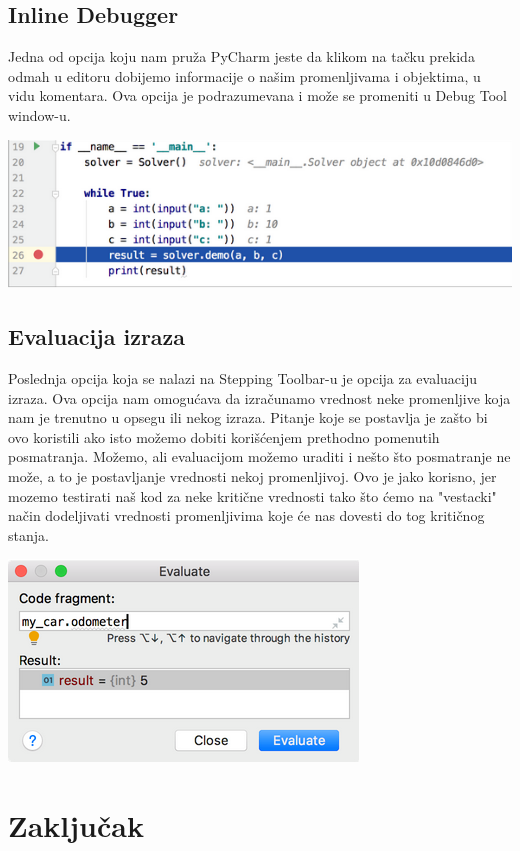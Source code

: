 \documentclass[a4paper]{article}
\begin{document}
\subsection{Inline Debugger}
Jedna od opcija koju nam pruža PyCharm jeste da klikom na tačku prekida odmah u editoru dobijemo informacije o našim promenljivama i objektima, u vidu komentara. Ova opcija je podrazumevana i može se promeniti u Debug Tool window-u\cite{pyCharm}.


\includegraphics[scale = 0.4]{3}
\subsection{Evaluacija izraza}
Poslednja opcija koja se nalazi na Stepping Toolbar-u je opcija za evaluaciju izraza. Ova opcija nam omogućava da izračunamo vrednost neke promenljive koja nam je trenutno u opsegu ili nekog izraza\cite{pyCharm}. Pitanje koje se postavlja je zašto bi ovo koristili ako isto možemo dobiti korišćenjem prethodno pomenutih posmatranja. Možemo, ali evaluacijom možemo uraditi i nešto što posmatranje ne može, a to je postavljanje vrednosti nekoj promenljivoj\cite{pyCharm}. Ovo je jako korisno, jer mozemo testirati naš kod za neke kritične vrednosti tako što ćemo na "vestacki" način dodeljivati vrednosti promenljivima koje će nas dovesti do tog kritičnog stanja.

\includegraphics[scale = 0.4]{4}
\section{Zaključak}
\label{sec:zakljucak}
\end{document}
